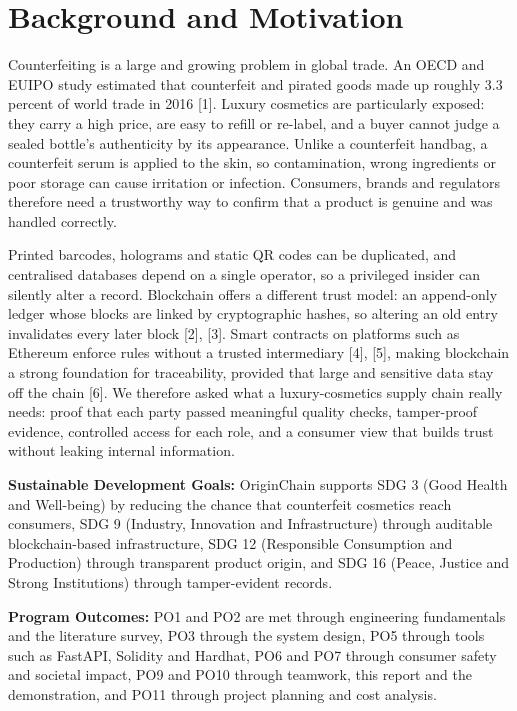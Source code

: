 \documentclass[12pt,a4paper]{report}
\begin{document}
\section{Background and Motivation}
Counterfeiting is a large and growing problem in global trade. An OECD and EUIPO study estimated that counterfeit and pirated goods made up roughly 3.3 percent of world trade in 2016 [1]. Luxury cosmetics are particularly exposed: they carry a high price, are easy to refill or re-label, and a buyer cannot judge a sealed bottle's authenticity by its appearance. Unlike a counterfeit handbag, a counterfeit serum is applied to the skin, so contamination, wrong ingredients or poor storage can cause irritation or infection. Consumers, brands and regulators therefore need a trustworthy way to confirm that a product is genuine and was handled correctly.

Printed barcodes, holograms and static QR codes can be duplicated, and centralised databases depend on a single operator, so a privileged insider can silently alter a record. Blockchain offers a different trust model: an append-only ledger whose blocks are linked by cryptographic hashes, so altering an old entry invalidates every later block [2], [3]. Smart contracts on platforms such as Ethereum enforce rules without a trusted intermediary [4], [5], making blockchain a strong foundation for traceability, provided that large and sensitive data stay off the chain [6]. We therefore asked what a luxury-cosmetics supply chain really needs: proof that each party passed meaningful quality checks, tamper-proof evidence, controlled access for each role, and a consumer view that builds trust without leaking internal information.

\vspace{0.3cm}
\noindent \textbf{Sustainable Development Goals:} OriginChain supports SDG 3 (Good Health and Well-being) by reducing the chance that counterfeit cosmetics reach consumers, SDG 9 (Industry, Innovation and Infrastructure) through auditable blockchain-based infrastructure, SDG 12 (Responsible Consumption and Production) through transparent product origin, and SDG 16 (Peace, Justice and Strong Institutions) through tamper-evident records.

\vspace{0.3cm}
\noindent \textbf{Program Outcomes:} PO1 and PO2 are met through engineering fundamentals and the literature survey, PO3 through the system design, PO5 through tools such as FastAPI, Solidity and Hardhat, PO6 and PO7 through consumer safety and societal impact, PO9 and PO10 through teamwork, this report and the demonstration, and PO11 through project planning and cost analysis.
\end{document}
